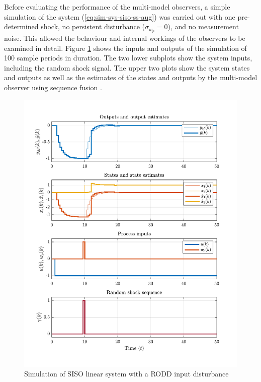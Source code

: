 Before evaluating the performance of the multi-model observers, a simple simulation of the system (\ref{eq:sim-sys-siso-ss-aug}) was carried out with one pre-determined shock, no persistent disturbance ($\sigma_{w_p}=0$), and no measurement noise. This allowed the behaviour and internal workings of the observers to be examined in detail. Figure \ref{fig:rod-obs-sim-test-ioplot-SF95} shows the inputs and outputs of the simulation of 100 sample periods in duration. The two lower subplots show the system inputs, including the random shock signal. The upper two plots show the system states and outputs as well as the estimates of the states and outputs by the multi-model observer using sequence fusion \citep{robertson_detection_1995}.
\begin{figure}[htp]
	\centering
	\includegraphics[width=14cm]{images/rod_MKF_SF_test_sim_MKF_SF95_ioplot.pdf}
	\caption{Simulation of SISO linear system with a RODD input disturbance}
	\label{fig:rod-obs-sim-test-ioplot-SF95}
\end{figure}

